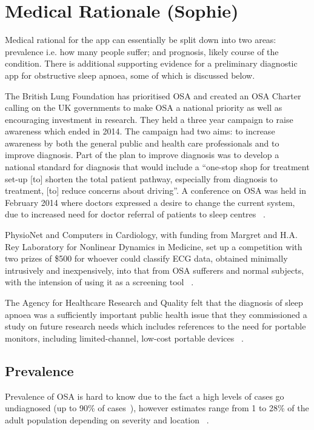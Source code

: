 \section{Medical Rationale (Sophie)}
\label{sec:medicalneed-sophie}
Medical rational for the app can essentially be split down into two areas: prevalence i.e. how many people suffer; and prognosis, likely course of the condition. There is additional supporting evidence for a preliminary diagnostic app for obstructive sleep apnoea, some of which is discussed below.

The British Lung Foundation has prioritised OSA and created an OSA Charter calling on the UK governments to make OSA a national priority as well as encouraging investment in research. They held a three year campaign to raise awareness which ended in 2014. The campaign had two aims: to increase awareness by both the general public and health care professionals and to improve diagnosis. Part of the plan to improve diagnosis was to develop a national standard for diagnosis that would include a ``one-stop shop for treatment set-up [to] shorten the total patient pathway, especially from diagnosis to treatment, [to] reduce concerns about driving''. A conference on OSA was held in February 2014 where doctors expressed a desire to change the current system, due to increased need for doctor referral of patients to sleep centres ~\cite{britishlungfoundation}.

PhysioNet and Computers in Cardiology, with funding from Margret and H.A. Rey Laboratory for Nonlinear Dynamics in Medicine, set up a competition with two prizes of \$500 for whoever could classify ECG data, obtained minimally intrusively and inexpensively, into that from OSA sufferers and normal subjects, with the intension of using it as a screening tool ~\cite{physionet}.

The Agency for Healthcare Research and Quality felt that the diagnosis of sleep apnoea was a sufficiently important public health issue that they commissioned a study on future research needs which includes references to the need for portable monitors, including limited-channel, low-cost portable devices ~\cite{balk2012future}.

\subsection{Prevalence}
Prevalence of OSA is hard to know due to the fact a high levels of cases go undiagnosed (up to 90\% of cases~\cite{finkel2009prevalence}), however estimates range from 1 to 28\% of the adult population depending on severity and location ~\cite{young2002epidemiology}.


